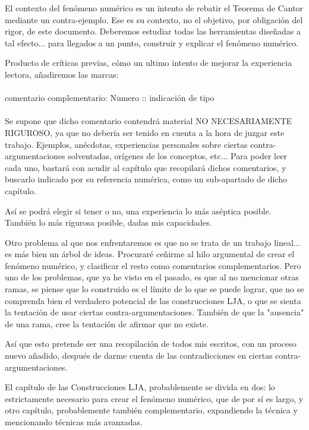 El contexto del fenómeno numérico es un intento de rebatir el Teorema de Cantor mediante un contra-ejemplo. Ese es su contexto, no el objetivo, por obligación del rigor, de este documento. Deberemos estudiar todas las herramientas diseñadas a tal efecto... para llegados a un punto, construir y explicar el fenómeno numérico.

Producto de críticas previas, cómo un ultimo intento de mejorar la experiencia lectora, añadiremos las marcas:\\\\
\noindent \right\langle comentario complementario: \right\langle Numero :: indicación de tipo\left\rangle  \:\: \left\rangle  \\\\
\noindent Se supone que dicho comentario contendrá material NO NECESARIAMENTE RIGUROSO, ya que no debería ser tenido en cuenta a la hora de juzgar este trabajo. Ejemplos, anécdotas, experiencias personales sobre ciertas contra-argumentaciones solventadas, orígenes de los conceptos, etc... Para poder leer cada uno, bastará con acudir al capítulo que recopilará dichos comentarios, y buscarlo indicado por su referencia numérica, como un sub-apartado de dicho capítulo.

Así se podrá elegir si tener o no, una experiencia lo más aséptica posible. También lo más rigurosa posible, dadas mis capacidades.

Otro problema al que nos enfrentaremos es que no se trata de un trabajo lineal... es más bien un árbol de ideas. Procuraré ceñirme al hilo argumental de crear el fenómeno numérico, y clasificar el resto como comentarios complementarios. Pero uno de los problemas, que ya he visto en el pasado, es que al no mencionar otras ramas, se piense que lo construido es el límite de lo que se puede lograr, que no se comprenda bien el verdadero potencial de las construcciones LJA, o que se sienta la tentación de usar ciertas contra-argumentaciones. También de que la "ausencia" de una rama, cree la tentación de afirmar que no existe.

Así que esto pretende ser una recopilación de todos mis escritos, con un proceso nuevo añadido, después de darme cuenta de las contradicciones en ciertas contra-argumentaciones.

El capítulo de las Construcciones LJA, probablemente se divida en dos: lo estrictamente necesario para crear el fenómeno numérico, que de por sí es largo, y otro capítulo, probablemente también complementario, expandiendo la técnica y mencionando técnicas más avanzadas.

